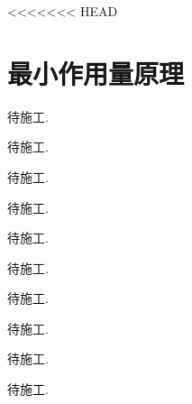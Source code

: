 <<<<<<< HEAD
\chapter{最小作用量原理}

\problem{}
\begin{solution}
    待施工.
\end{solution}

\problem{}
\begin{solution}
    待施工.
\end{solution}


\problem{}
\begin{solution}
    待施工.
\end{solution}


\problem{}
\begin{solution}
    待施工.
\end{solution}


\problem{}
\begin{solution}
    待施工.
\end{solution}


\problem{}
\begin{solution}
    待施工.
\end{solution}


\problem{}
\begin{solution}
    待施工.
\end{solution}


\problem{}
\begin{solution}
    待施工.
\end{solution}



\problem{}
\begin{solution}
    待施工.
\end{solution}



\problem{}
\begin{solution}
    待施工.
\end{solution}



